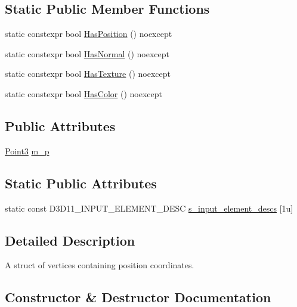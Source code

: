 \subsection*{Static Public Member Functions}
\begin{DoxyCompactItemize}
\item 
static constexpr bool \mbox{\hyperlink{structmage_1_1rendering_1_1_vertex_position_a23134a6f43a36f72f94ec6dba3024503}{Has\+Position}} () noexcept
\item 
static constexpr bool \mbox{\hyperlink{structmage_1_1rendering_1_1_vertex_position_abf33917c1c93dfcffd25c146b53189e8}{Has\+Normal}} () noexcept
\item 
static constexpr bool \mbox{\hyperlink{structmage_1_1rendering_1_1_vertex_position_aac518715cc922a0094261f075f8ae80b}{Has\+Texture}} () noexcept
\item 
static constexpr bool \mbox{\hyperlink{structmage_1_1rendering_1_1_vertex_position_afe87ed5fda84b4acc17a94a07d389ff7}{Has\+Color}} () noexcept
\end{DoxyCompactItemize}
\subsection*{Public Attributes}
\begin{DoxyCompactItemize}
\item 
\mbox{\hyperlink{structmage_1_1_point3}{Point3}} \mbox{\hyperlink{structmage_1_1rendering_1_1_vertex_position_a49602fa786c64fb0fca47a0a0992f779}{m\+\_\+p}}
\end{DoxyCompactItemize}
\subsection*{Static Public Attributes}
\begin{DoxyCompactItemize}
\item 
static const D3\+D11\+\_\+\+I\+N\+P\+U\+T\+\_\+\+E\+L\+E\+M\+E\+N\+T\+\_\+\+D\+E\+SC \mbox{\hyperlink{structmage_1_1rendering_1_1_vertex_position_a669150e1acd6ed132eec465745ddb201}{s\+\_\+input\+\_\+element\+\_\+descs}} \mbox{[}1u\mbox{]}
\end{DoxyCompactItemize}


\subsection{Detailed Description}
A struct of vertices containing position coordinates. 

\subsection{Constructor \& Destructor Documentation}
\mbox{\label{structmage_1_1rendering_1_1_vertex_position_a9df4fa391d76a89997e8b512fc3142d2}} 
